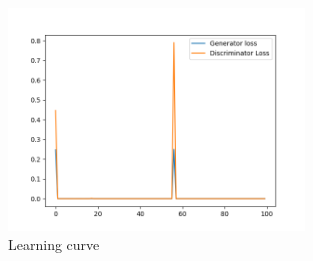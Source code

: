 \documentclass[a4paper]{article}
\theoremstyle{definition}
\newenvironment{soln}{
	\leavevmode\color{blue}\ignorespaces
}{}
\begin{document}
\begin{enumerate} [label=(\alph*)]
		\begin{soln}
                \begin{figure}[H]
    			\centering
    			\includegraphics[width=0.7\textwidth]{hw6/1.b/1_b_loss.png}
    			\caption{Learning curve}
    			\label{fig:gan_q1_loss}
    		\end{figure}
    		

\end{soln}
\end{enumerate}
\end{document}
